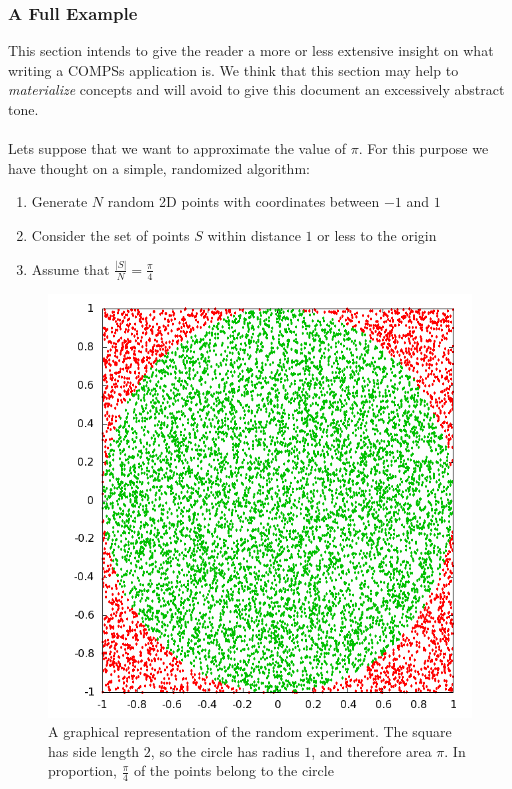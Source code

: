 \newpage
\subsubsection{A Full Example}
\label{subsec:compss_example}
This section intends to give the reader a more or less extensive insight on what writing a COMPSs application is. We think that this section may help to \textit{materialize} concepts and will avoid to give this document an excessively abstract tone.\\
\\
Lets suppose that we want to approximate the value of $\pi$. For this purpose we have thought on a simple, randomized algorithm:
\begin{enumerate}
\item Generate $N$ random 2D points with coordinates between $-1$ and $1$
\item Consider the set of points $S$ within distance $1$ or less to the origin
\item Assume that $\frac{|S|}{N} = \frac{\pi}{4}$
\end{enumerate}

\begin{figure}[ht!]
\centering
\includegraphics[scale=0.5]{figures/circle_square.png}
\caption{A graphical representation of the random experiment. The square has side length $2$, so the circle has radius $1$, and therefore area $\pi$. In proportion, $\frac{\pi}{4}$ of the points belong to the circle}
\label{fig:circle_square}
\end{figure}

